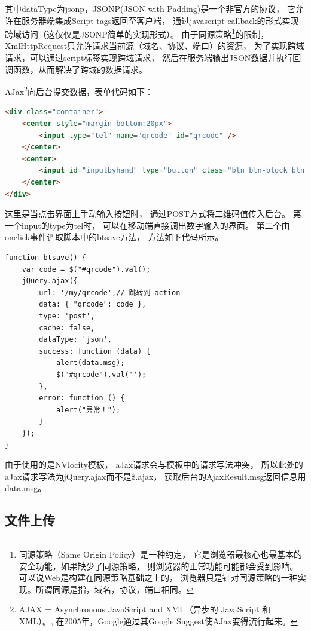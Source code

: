 \documentclass{book}
\begin{document}
其中dataType为jsonp，JSONP(JSON with Padding)是一个非官方的协议，
它允许在服务器端集成Script tags返回至客户端，
通过javascript callback的形式实现跨域访问（这仅仅是JSONP简单的实现形式）。
由于同源策略\footnote{同源策略（Same Origin Policy）是一种约定，
它是浏览器最核心也最基本的安全功能，如果缺少了同源策略，
则浏览器的正常功能可能都会受到影响。可以说Web是构建在同源策略基础之上的，
浏览器只是针对同源策略的一种实现。所谓同源是指，域名，协议，端口相同。}的限制，
XmlHttpRequest只允许请求当前源（域名、协议、端口）的资源，
为了实现跨域请求，可以通过script标签实现跨域请求，
然后在服务端输出JSON数据并执行回调函数，从而解决了跨域的数据请求。

AJax\footnote{AJAX = Asynchronous JavaScript and XML（异步的 JavaScript 和 XML）。,
在2005年，Google通过其Google Suggest使AJax变得流行起来。}向后台提交数据，表单代码如下：

\begin{lstlisting}[language=HTML]
<div class="container">           
    <center style="margin-bottom:20px">
        <input type="tel" name="qrcode" id="qrcode" />
    </center>
    <center>
        <input id="inputbyhand" type="button" class="btn btn-block btn-lg btn-danger" onclick="btsave();" value="手动输入验证" />
    </center>
</div>
\end{lstlisting}

这里是当点击界面上手动输入按钮时，
通过POST方式将二维码值传入后台。
第一个input的type为tel时，
可以在移动端直接调出数字输入的界面。
第二个由onclick事件调取脚本中的btsave方法，
方法如下代码所示。

\begin{lstlisting}[language=VBScript]
function btsave() {
    var code = $("#qrcode").val();
    jQuery.ajax({
        url: '/my/qrcode',// 跳转到 action
        data: { "qrcode": code },
        type: 'post',
        cache: false,
        dataType: 'json',
        success: function (data) {                    
            alert(data.msg);
            $("#qrcode").val('');
        },
        error: function () {
            alert("异常！");
        }
    });
}
\end{lstlisting}

由于使用的是NVlocity模板，
aJax请求会与模板中的请求写法冲突，
所以此处的aJax请求写法为jQuery.ajax而不是\$.ajax，
获取后台的AjaxResult.msg返回信息用data.msg。

\subsection{文件上传}
\end{document}
